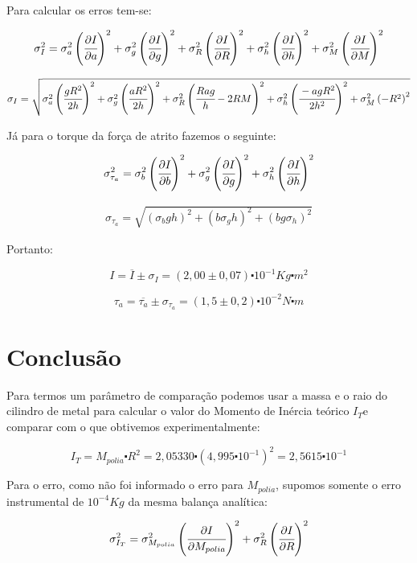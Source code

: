 \documentclass[a4paper]{article}
\begin{document}
Para calcular os erros tem-se:

$$ \sigma_{I}^{2}=\sigma_{a}^{2}\left(\cfrac[r]{\partial I}{\partial a}\right)^{2}+\sigma_{g}^{2}\left(\cfrac[r]{\partial I}{\partial g}\right)^{2}+\sigma_{R}^{2}\left(\cfrac{\partial I}{\partial R}\right)^{2}+\sigma_{h}^{2}\left(\cfrac[r]{\partial I}{\partial h}\right)^{2}+\sigma_{M}^{2}\left(\cfrac{\partial I}{\partial M}\right)^{2} $$

\begin{align}
\sigma_{I}=\sqrt{\sigma_{a}^{2}\left(\cfrac[r]{gR^{2}}{2h}\right)^{2}+\sigma_{g}^{2}\left(\cfrac[r]{aR^{2}}{2h}\right)^{2}+\sigma_{R}^{2}\left(\cfrac{Rag}{h}-2RM\right)^{2}+\sigma_{h}^{2}\left(\cfrac[r]{-agR^{2}}{2h^{2}}\right)^{2}+\sigma_{M}^{2}\left(-R^{2}\right)^{2}}\end{align}

Já para o torque da força de atrito fazemos o seguinte:


$$\sigma_{\tau_{a}}^{2}=\sigma_{b}^{2}\left(\cfrac[r]{\partial I}{\partial b}\right)^{2}+\sigma_{g}^{2}\left(\cfrac[r]{\partial I}{\partial g}\right)^{2}+\sigma_{h}^{2}\left(\cfrac[r]{\partial I}{\partial h}\right)^{2}$$

\begin{align}
\sigma_{\tau_{a}}=\sqrt{(\sigma_{b}gh)^{2}+(b\sigma_{g}h)^{2}+(bg\sigma_{h})^{2}}
\end{align}

Portanto:

$$I=\overline{I}\pm\sigma_{I}=(2,00\pm0,07)\centerdot10^{-1}Kg\centerdot m^{2}$$

$$\tau_{a}=\overline{\tau_{a}}\pm\sigma_{\tau_{a}}=(1,5\pm0,2)\centerdot10^{-2}N\centerdot m$$

\section{Conclusão}

Para termos um parâmetro de comparação podemos usar a massa e o raio do cilindro de metal para calcular o valor do Momento de Inércia teórico
$I_{T}$e comparar com o que obtivemos experimentalmente:

$$I_{T}=M_{polia}\centerdot R^{2}=2,05330\centerdot(4,995\centerdot10^{-1})^{2}=2,5615\centerdot10^{-1}$$

Para o erro, como não foi informado o erro para $M_{polia}$, supomos somente o erro instrumental de $10^{-4}$$Kg$ da mesma balança analítica:

$$
\sigma_{I_{T}}^{2}=\sigma_{M_{polia}}^{2}\left(\cfrac{\partial I}{\partial M_{polia}}\right)^{2}+\sigma_{R}^{2}\left(\cfrac{\partial I}{\partial R}\right)^{2}
$$
\end{document}

